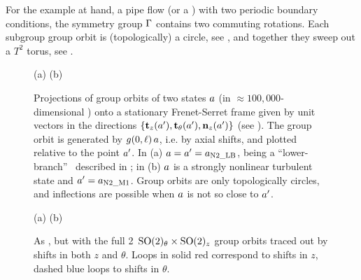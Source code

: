 \documentclass{jfm}
\begin{document}
For the example at hand, a pipe flow (or a \pCf) with two periodic
boundary conditions, the symmetry group $\Gamma$ contains two commuting
 rotations. Each  subgroup group orbit is (topologically) a
circle, see , and together they sweep out a
$T^2$ torus, see .
\begin{figure}
  \centering
(a)%
(b)%
  \caption{\label{fig:2840GOt135th0}
Projections of group orbits of two states $a$ (in $\approx
100,000$-dimensional {\statesp}) onto a stationary Frenet-Serret frame
given by unit vectors in the directions
$\{\mathbf{t}_z(a'),\mathbf{t}_\theta(a'),\mathbf{n}_z(a')\}$ (see
). The group orbit is generated by
$g(0,\ell)\,a$, i.e. by axial shifts, and plotted relative to the
point $a'$.
In (a) $a=a'=a_\mathrm{N2\_LB}$, being a ``lower-branch'' \reqv\
described in ;
in (b) $a$ is a strongly nonlinear turbulent state
and $a'=a_\mathrm{N2\_M1}$.
Group orbits are only topologically circles, and inflections are possible
when $a$ is not so close to $a'$.
  }
\end{figure}


\begin{figure}
  \centering
(a)%
(b)%
  \caption{\label{fig:2830GO6}
As , but with the
full 2\dmn\ $\textrm{SO}(2)_{\theta} \times \textrm{SO}(2)_z$ group orbits traced out
by shifts in both $z$ and $\theta$. Loops in solid red correspond to
shifts in $z$, dashed blue loops to shifts in $\theta$.
  }
\end{figure}
\end{document}

